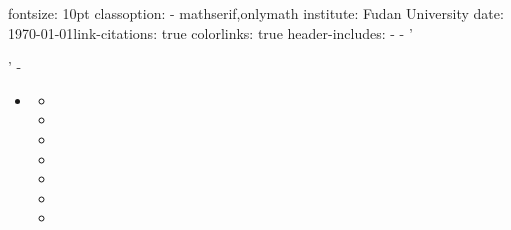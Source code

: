 \documentclass[
  ignorenonframetext,
]{beamer}
\begin{document}
\begin{frame}
fontsize: 10pt classoption: - mathserif,onlymath institute: Fudan
University date: \today link-citations: true colorlinks: true
header-includes: -  - '\ifxetex

\usepackage[UTF8]{ctex}

\fi' -

\usepackage[footnotesize]{subfigure}

\begin{itemize}
\item
  \usepackage{tikz,pgf,pgfplots}

  \begin{itemize}
  \item
    \usetikzlibrary{arrows}
  \item
  \item
    \newcommand{\columnsbegin}{\begin{columns}}
  \item
    \newcommand{\columnsend}{\end{columns}}
  \item
    \newcommand{\col}[1]{\column{#1}}
  \item
  \item
  \end{itemize}
\end{itemize}
\end{frame}
\end{document}
